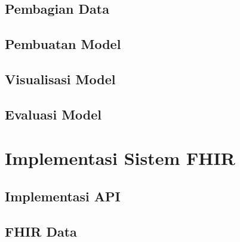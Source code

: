 \documentclass[ugmtesis]{ugmtesis}
\begin{document}
		\subsection{Pembagian Data}
		\label{implementasi pembagian data}
		

		\subsection{Pembuatan Model}
		\label{implementasi pembuatan model}
		

		\subsection{Visualisasi Model}
		\label{implementasi visualisasi model}
		


		\subsection{Evaluasi Model}
		\label{implementasi evaluasi model}
		

	\section{Implementasi Sistem FHIR}
	\label{implementasi sistem fhir}
	

		\subsection{Implementasi API}
		\label{implementasi API}
		

		\subsection{FHIR Data}
		\label{FHIR data}
		

\end{document}

